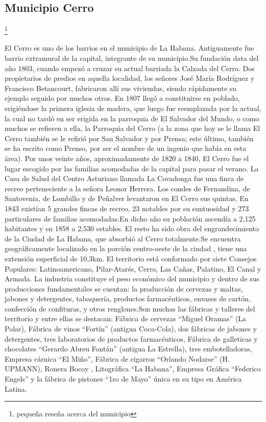 \documentclass[twocolumn,12pt]{article}
\begin{document}
\newpage
\subsection{Municipio Cerro}

\footnote{pequeña reseña acerca del municipio}

El Cerro es uno de los barrios en el municipio de La Habana. Antiguamente fue barrio extramural de la capital, integrante de su municipio.Su fundación data del año 1803, cuando empezó a cruzar su actual barriada la Calzada del Cerro. Dos propietarios de predios en aquella localidad, los señores José María Rodríguez y Francisco Betancourt, fabricaron allí sus viviendas, siendo rápidamente su ejemplo seguido por muchos otros.
En 1807 llegó a constituirse en poblado, erigiéndose la primera iglesia de madera, que luego fue reemplazada por la actual, la cual no tardó en ser erigida en la parroquia de El Salvador del Mundo, o como muchos se refieren a ella, la Parroquia del Cerro (a la zona que hoy se le llama El Cerro también se le refirió por San Salvador y por Prensa; este último, también se ha escrito como Prenso, por ser el nombre de un ingenio que había en esta área).
Por unos veinte años, aproximadamente de 1820 a 1840, El Cerro fue el lugar escogido por las familias acomodadas de la capital para pasar el verano.
La Casa de Salud del Centro Asturiano llamada La Covadonga fue una finca de recreo perteneciente a la señora Leonor Herrera.
Los condes de Fernandina, de Santovenia, de Lombillo y de Peñalver levantaron en El Cerro sus quintas. En 1843 existían 5 grandes fincas de recreo, 23 notables por su suntuosidad y 273 particulares de familias acomodadas.En dicho año su población ascendía a 2,125 habitantes y en 1858 a 2,530 estables. El resto ha sido obra del engrandecimiento de la Ciudad de La Habana, que absorbió al Cerro totalmente.Se encuentra geográficamente localizado en la porción centro-oeste de la ciudad , tiene una extensión superficial de 10,3km. El territorio está conformado por siete Consejos Populares: Latinoamericano, Pilar-Atarés, Cerro, Las Cañas, Palatino, El Canal y Armada.
La industria constituye el peso económico del municipio y dentro de sus producciones fundamentales se cuentan: la producción de cervezas y maltas, jabones y detergentes, tabaquería, productos farmacéuticos, envases de cartón, confección de confituras, y otros renglones.Son muchas las fábricas y talleres del territorio y entre ellas se destacan: Fábrica de cervezas “Miguel Oramas” (La Polar), Fábrica de vinos “Fortín” (antigua Coca-Cola), dos fábricas de jabones y detergentes, tres laboratorios de productos farmacéuticos, Fábrica de galleticas y chocolates “Gerardo Abreu Fontán” (antigua La Estrella), tres embotelladoras, Empresa cárnica “El Miño”, Fábrica de cigarros “Orlando Nodarse” (H. UPMANN), Ronera Bocoy , Litográfica “La Habana”, Empresa Gráfica “Federico Engels” y la fábrica de pistones “1ro de Mayo” única en su tipo en América Latina.
\end{document}
